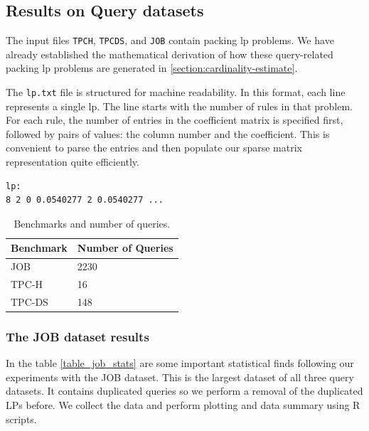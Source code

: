 \subsection{Results on Query datasets}
The input files \texttt{TPCH}, \texttt{TPCDS}, and \texttt{JOB} contain packing
\gls{lp} problems. We have already established the mathematical derivation of how
these query-related packing
\gls{lp} problems are generated in \ref{section:cardinality-estimate}.

The \texttt{lp.txt} file is structured for machine readability.
In this format, each line represents a single \gls{lp}. The line starts with
the number of rules in that problem. For each rule, the number of entries in
the coefficient matrix is specified first, followed by pairs of values:
the column number and the coefficient. This is convenient to parse the entries
and then populate our sparse matrix representation quite efficiently.

\begin{lstlisting}
lp:
8 2 0 0.0540277 2 0.0540277 ...
\end{lstlisting} \label{format_input}

\begin{table}[!htb]
    \centering
    \caption{Benchmarks and number of queries.}
    \begin{tabular}{|l|l|}
        \hline
        Benchmark                                & Number of Queries \\
        \hline
        JOB \parencite{10.14778/2850583.2850594} & 2230              \\
        TPC-H \parencite{tpch}                   & 16                \\
        TPC-DS \parencite{tpcds2022}             & 148               \\
        \hline
    \end{tabular}
    \label{job_tpch_tpcds}
\end{table}

\subsubsection{The JOB dataset results}
In the table \ref{table_job_stats} are some important statistical finds following our
experiments with the JOB dataset.
This is the largest dataset of all three query datasets. It contains duplicated queries so we
perform a removal of the duplicated LPs before. We collect the data and perform plotting and data summary
using R scripts.

